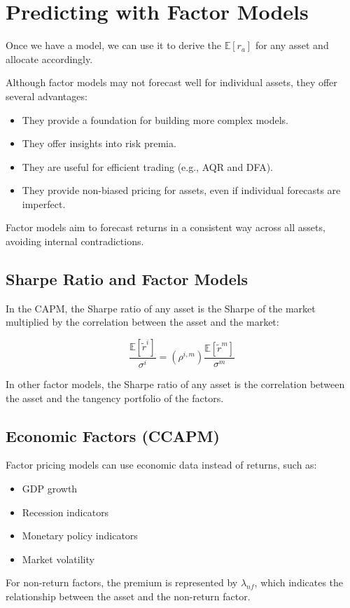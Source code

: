 \documentclass{article}
\begin{document}
\section{Predicting with Factor Models}
Once we have a model, we can use it to derive the \( \mathbb{E}[r_a] \) for any asset and allocate accordingly.

Although factor models may not forecast well for individual assets, they offer several advantages:
\begin{itemize}
    \item They provide a foundation for building more complex models.
    \item They offer insights into risk premia.
    \item They are useful for efficient trading (e.g., AQR and DFA).
    \item They provide non-biased pricing for assets, even if individual forecasts are imperfect.
\end{itemize}

Factor models aim to forecast returns in a consistent way across all assets, avoiding internal contradictions.

\subsection{Sharpe Ratio and Factor Models}
In the CAPM, the Sharpe ratio of any asset is the Sharpe of the market multiplied by the correlation between the asset and the market:

\[
\frac{\mathbb{E}[\tilde{r}^i]}{\sigma^i} = (\rho^{i, m}) \frac{\mathbb{E}[\tilde{r}^m]}{\sigma^m}
\]

In other factor models, the Sharpe ratio of any asset is the correlation between the asset and the tangency portfolio of the factors.

\subsection{Economic Factors (CCAPM)}
Factor pricing models can use economic data instead of returns, such as:
\begin{itemize}
    \item GDP growth
    \item Recession indicators
    \item Monetary policy indicators
    \item Market volatility
\end{itemize}

For non-return factors, the premium is represented by \( \lambda_{nf} \), which indicates the relationship between the asset and the non-return factor.
\end{document}
